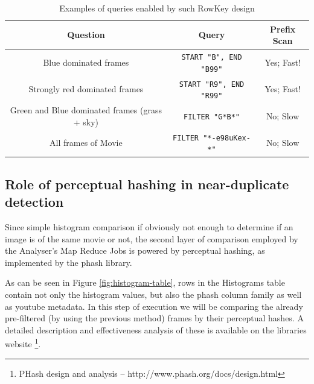 \begin{table}[ch!]
  \centering
  \begin{tabular}{|c|c|c|}
  \hline
  \textbf{Question}                  & \textbf{Query}                    & Prefix Scan \\ \hline
  Blue dominated frames              & \verb|START "B", END "B99"|       & Yes; Fast! \\ \hline
  Strongly red dominated frames      & \verb|START "R9", END "R99"|      & Yes; Fast! \\ \hline
  Green and Blue dominated frames (grass + sky) & \verb|FILTER "G*B*"|   & No; Slow \\ \hline
  All frames of Movie                & \verb|FILTER "*-e98uKex-*"|       & No; Slow \\ \hline
  \end{tabular}
  \caption{Examples of queries enabled by such RowKey design}
\end{table}


\subsection{Role of perceptual hashing in near-duplicate detection}
\label{sec:perceptual-hashing}
Since simple histogram comparison if obviously not enough to determine if an image is of the same movie or not,
the second layer of comparison employed by the Analyser's Map Reduce Jobs is powered by perceptual hashing, as implemented by the phash \cite{phash} library.

As can be seen in Figure \ref{fig:histogram-table}, rows in the Histograms table contain not only the histogram values, but also the phash column family as well as youtube metadata. In this step of execution we will be comparing the already pre-filtered (by using the previous method) frames by their perceptual hashes. A detailed description and effectiveness analysis of these is available on the libraries website \footnote{PHash design and analysis -- http://www.phash.org/docs/design.html}.

